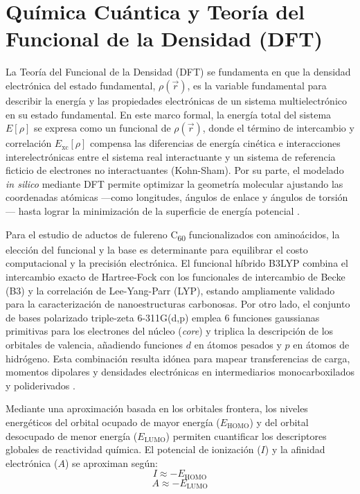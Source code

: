 \section{Química Cuántica y Teoría del Funcional de la Densidad (DFT)}
La Teoría del Funcional de la Densidad (DFT) se fundamenta en que la densidad electrónica del estado fundamental, $\rho(\vec{r})$, es la variable fundamental para describir la energía y las propiedades electrónicas de un sistema multielectrónico en su estado fundamental. En este marco formal, la energía total del sistema $E[\rho]$ se expresa como un funcional de $\rho(\vec{r})$, donde el término de intercambio y correlación $E_{\text{xc}}[\rho]$ compensa las diferencias de energía cinética e interacciones interelectrónicas entre el sistema real interactuante y un sistema de referencia ficticio de electrones no interactuantes (Kohn-Sham). Por su parte, el modelado \textit{in silico} mediante DFT permite optimizar la geometría molecular ajustando las coordenadas atómicas —como longitudes, ángulos de enlace y ángulos de torsión— hasta lograr la minimización de la superficie de energía potencial \cite{kohn1965self}.

Para el estudio de aductos de fulereno C\textsubscript{60} funcionalizados con aminoácidos, la elección del funcional y la base es determinante para equilibrar el costo computacional y la precisión electrónica. El funcional híbrido B3LYP combina el intercambio exacto de Hartree-Fock con los funcionales de intercambio de Becke (B3) y la correlación de Lee-Yang-Parr (LYP), estando ampliamente validado para la caracterización de nanoestructuras carbonosas. Por otro lado, el conjunto de bases polarizado triple-zeta 6-311G(d,p) emplea 6 funciones gaussianas primitivas para los electrones del núcleo (\textit{core}) y triplica la descripción de los orbitales de valencia, añadiendo funciones $d$ en átomos pesados y $p$ en átomos de hidrógeno. Esta combinación resulta idónea para mapear transferencias de carga, momentos dipolares y densidades electrónicas en intermediarios monocarboxilados y poliderivados \cite{nikolaev2020thermodynamic, mico2024estudio}.

 Mediante una aproximación basada en los orbitales frontera, los niveles energéticos del orbital ocupado de mayor energía ($E_{\text{HOMO}}$) y del orbital desocupado de menor energía ($E_{\text{LUMO}}$) permiten cuantificar los descriptores globales de reactividad química. El potencial de ionización ($I$) y la afinidad electrónica ($A$) se aproximan según:
\begin{equation}
I \approx -E_{\text{HOMO}}
\end{equation}
\begin{equation}
A \approx -E_{\text{LUMO}}
\end{equation}


